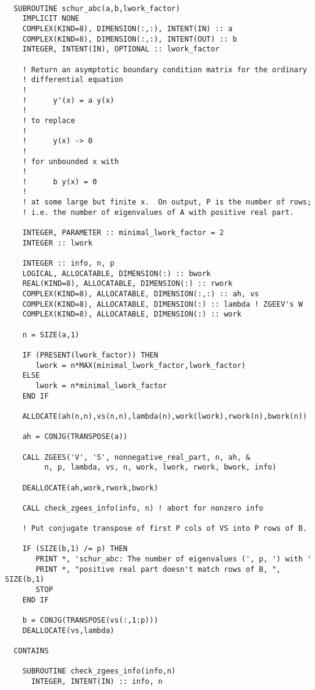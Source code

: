 \documentclass{article}
\begin{document}
\begin{verbatim}

  SUBROUTINE schur_abc(a,b,lwork_factor)
    IMPLICIT NONE
    COMPLEX(KIND=8), DIMENSION(:,:), INTENT(IN) :: a
    COMPLEX(KIND=8), DIMENSION(:,:), INTENT(OUT) :: b
    INTEGER, INTENT(IN), OPTIONAL :: lwork_factor

    ! Return an asymptotic boundary condition matrix for the ordinary
    ! differential equation 
    !
    !      y'(x) = a y(x) 
    !
    ! to replace 
    !
    !      y(x) -> 0 
    !
    ! for unbounded x with
    !
    !      b y(x) = 0
    !
    ! at some large but finite x.  On output, P is the number of rows;
    ! i.e. the number of eigenvalues of A with positive real part.

    INTEGER, PARAMETER :: minimal_lwork_factor = 2
    INTEGER :: lwork

    INTEGER :: info, n, p
    LOGICAL, ALLOCATABLE, DIMENSION(:) :: bwork
    REAL(KIND=8), ALLOCATABLE, DIMENSION(:) :: rwork
    COMPLEX(KIND=8), ALLOCATABLE, DIMENSION(:,:) :: ah, vs
    COMPLEX(KIND=8), ALLOCATABLE, DIMENSION(:) :: lambda ! ZGEEV's W
    COMPLEX(KIND=8), ALLOCATABLE, DIMENSION(:) :: work

    n = SIZE(a,1)

    IF (PRESENT(lwork_factor)) THEN
       lwork = n*MAX(minimal_lwork_factor,lwork_factor)
    ELSE
       lwork = n*minimal_lwork_factor
    END IF

    ALLOCATE(ah(n,n),vs(n,n),lambda(n),work(lwork),rwork(n),bwork(n))

    ah = CONJG(TRANSPOSE(a))

    CALL ZGEES('V', 'S', nonnegative_real_part, n, ah, &
         n, p, lambda, vs, n, work, lwork, rwork, bwork, info)

    DEALLOCATE(ah,work,rwork,bwork)

    CALL check_zgees_info(info, n) ! abort for nonzero info

    ! Put conjugate transpose of first P cols of VS into P rows of B. 

    IF (SIZE(b,1) /= p) THEN
       PRINT *, 'schur_abc: The number of eigenvalues (', p, ') with '
       PRINT *, "positive real part doesn't match rows of B, ", SIZE(b,1)
       STOP 
    END IF

    b = CONJG(TRANSPOSE(vs(:,1:p))) 
    DEALLOCATE(vs,lambda)

  CONTAINS 

    SUBROUTINE check_zgees_info(info,n) 
      INTEGER, INTENT(IN) :: info, n


\end{verbatim}
\end{document}

